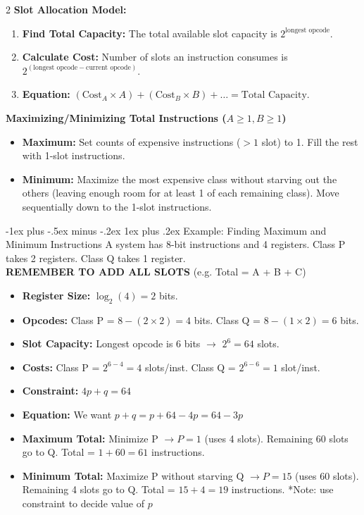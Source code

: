 \documentclass[10pt, portrait]{article}
\makeatletter
\renewcommand{\subsection}{\@startsection{subsection}{3}{0mm}%
                                {-1ex plus -.5ex minus -.2ex}%
                                {1ex plus .2ex}%
                                {\normalfont\small\bfseries}}%
\renewcommand{\bf}[1]{\textbf{#1}}
\makeatother
\begin{document}
\begin{multicols*}{2}
\textbf{Slot Allocation Model:}
\begin{enumerate}
    \item \textbf{Find Total Capacity:} The total available slot capacity is $2^{\text{longest opcode}}$.
    \item \textbf{Calculate Cost:} Number of slots an instruction consumes is $2^{(\text{longest opcode} - \text{current opcode})}$.
    \item \textbf{Equation:} $(\text{Cost}_A \times A) + (\text{Cost}_B \times B) + \dots = \text{Total Capacity}$.
\end{enumerate}

\textbf{Maximizing/Minimizing Total Instructions ($A \geq 1, B \geq 1$)}
\begin{itemize}
    \item \textbf{Maximum:} Set counts of expensive instructions ($>1$ slot) to 1. Fill the rest with 1-slot instructions.
    \item \textbf{Minimum:} Maximize the most expensive class without starving out the others (leaving enough room for at least 1 of each remaining class). Move sequentially down to the 1-slot instructions.
\end{itemize}

\subsection{Example: Finding Maximum and Minimum Instructions}
A system has 8-bit instructions and 4 registers. Class P takes 2 registers. Class Q takes 1 register.\\
\bf{REMEMBER TO ADD ALL SLOTS} (e.g. Total = A + B + C)
\begin{itemize}
    \item \textbf{Register Size:} $\log_2(4) = 2$ bits.
    \item \textbf{Opcodes:} Class P = $8 - (2 \times 2) = 4$ bits. Class Q = $8 - (1 \times 2) = 6$ bits.
    \item \textbf{Slot Capacity:} Longest opcode is 6 bits $\rightarrow$ $2^6 = 64$ slots.
    \item \textbf{Costs:} Class P = $2^{6-4} = 4$ slots/inst. Class Q = $2^{6-6} = 1$ slot/inst.
    \item \textbf{Constraint:} $4p + q = 64$
    \item \textbf{Equation:} We want $p + q = p + 64 - 4p = 64 - 3p$
    \item \textbf{Maximum Total:} Minimize P $\rightarrow P=1$ (uses 4 slots). Remaining 60 slots go to Q. Total = $1 + 60 = 61$ instructions.
    \item \textbf{Minimum Total:} Maximize P without starving Q $\rightarrow P=15$ (uses 60 slots). Remaining 4 slots go to Q. Total = $15 + 4 = 19$ instructions. *Note: use constraint to decide value of $p$
\end{itemize}


\end{multicols*}
\end{document}
